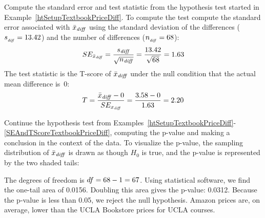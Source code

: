 \begin{examplewrap}
\begin{nexample}{Compute the standard error and test statistic
    from the hypothesis test started in
    Example~\ref{htSetupTextbookPriceDiff}.}
  \label{SEAndTScoreTextbookPriceDiff}
  To compute the test  compute the standard error associated with
  $\bar{x}_{\text{\emph{diff}}}$ using the standard
  deviation of the differences
  ($s_{_{\text{\emph{diff}}}} = 13.42{}$)
  and the number of differences
  ($n_{_{\text{\emph{diff}}}} = 68{}$):
  \begin{align*}
  SE_{\bar{x}_{\text{\emph{diff}}}}
    = \frac{s_{\text{\emph{diff}}}}{\sqrt{n_{\text{\emph{diff}}}}}
    = \frac{13.42{}}{\sqrt{68{}}} = 1.63{}
  \end{align*}
  The test statistic is the T-score of
  $\bar{x}_{\text{\emph{diff}}}$
  under the null condition that the actual mean
  difference is~0:
  \begin{align*}
  T
    = \frac{\bar{x}_{\text{\emph{diff}}} - 0}
        {SE_{x_{\text{\emph{diff}}}}}
    = \frac{3.58{} - 0}{1.63{}} = 2.20
  \end{align*}
\end{nexample}
\end{examplewrap}

\begin{examplewrap}
\begin{nexample}{Continue the hypothesis test from
    Examples~\ref{htSetupTextbookPriceDiff}-\ref{SEAndTScoreTextbookPriceDiff},
    computing the p-value and making a conclusion in the
    context of the data.}
  To visualize the p-value, the sampling distribution
  of $\bar{x}_{\text{\emph{diff}}}$ is drawn as though
  $H_0$ is true,
  and the p-value is represented by the two shaded tails:
  \begin{center}
  \end{center}
  The degrees of freedom is
  $df = 68{} - 1 = 67{}$.
  Using statistical software, we find the
  one-tail area of 0.0156.
  Doubling this area gives the p-value: 0.0312.
  Because the p-value is less than 0.05,
  we reject the null hypothesis.
  Amazon prices are, on average, lower than the
  UCLA Bookstore prices for UCLA courses.
\end{nexample}
\end{examplewrap}

